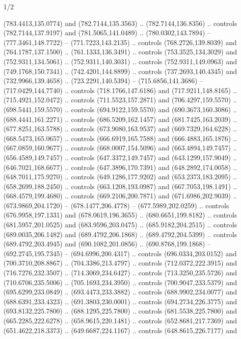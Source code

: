 \begin{flagdescription}{1/2}
\begin{scope}[shift={(2*\flaglength/3-0.25*\rb,0.51333\flagwidth)},scale=0.001715\flagwidth*\stretchfactor]
\begin{scope}[y=-1pt, x=1pt,cm={{1.04354,0.0,0.0,1.01818,(-827,-297)}}]
\begin{scope}[fill=gold]
  (783.4413,135.0774) and (782.7144,135.3563) .. (782.7144,136.8356) .. controls
  (782.7144,137.9197) and (781.5065,141.0489) .. (780.0302,143.7894) --
  (777.3461,148.7722) -- (771.7223,143.2135) .. controls (768.2726,139.8039) and
  (764.1787,137.1500) .. (761.1333,136.3491) .. controls (753.3525,134.3029) and
  (752.9311,134.5061) .. (752.9311,140.3031) .. controls (752.9311,149.0963) and
  (749.1768,150.7341) .. (742.4201,144.8899) .. controls (737.2693,140.4345) and
  (732.9966,139.4658) .. (723.2291,140.5394) -- (715.6856,141.3686) --
  (717.0429,144.7740) .. controls (718.1766,147.6186) and (717.9211,148.8165) ..
  (715.4921,152.0472) .. controls (711.5523,157.2871) and (706.4297,159.5570) ..
  (698.5441,159.5570) .. controls (694.9122,159.5570) and (690.3673,160.3086) ..
  (688.4441,161.2271) .. controls (686.5209,162.1457) and (681.7425,163.2039) ..
  (677.8251,163.5788) .. controls (673.9080,163.9537) and (669.7329,164.6228) ..
  (668.5473,165.0657) .. controls (666.6919,165.7588) and (666.4883,165.1876) ..
  (667.0859,160.9677) .. controls (668.0007,154.5096) and (663.4894,149.7457) ..
  (656.4589,149.7457) .. controls (647.3372,149.7457) and (643.1299,157.9049) ..
  (646.7021,168.6677) .. controls (647.3896,170.7391) and (648.2892,174.0058) ..
  (648.7011,175.9270) .. controls (649.1286,177.9202) and (653.2373,183.2095) ..
  (658.2699,188.2450) .. controls (663.1208,193.0987) and (667.7053,198.1491) ..
  (668.4579,199.4680) .. controls (669.2106,200.7871) and (671.6986,202.9039) ..
  (673.9869,204.1720) -- (678.1477,206.4778) -- (677.5989,202.0259) .. controls
  (676.9958,197.1331) and (678.0619,196.3655) .. (680.6651,199.8182) .. controls
  (681.5957,201.0525) and (683.9596,203.0475) .. (685.9182,204.2515) .. controls
  (689.0035,206.1482) and (689.4792,206.1868) .. (689.4792,204.5399) .. controls
  (689.4792,203.4945) and (690.1082,201.0856) .. (690.8768,199.1868) --
  (692.2745,195.7345) -- (694.6996,200.4317) .. controls (696.0334,203.0152) and
  (700.3710,208.8867) .. (704.3386,213.4797) .. controls (712.0372,222.3915) and
  (716.7276,232.3507) .. (714.3069,234.6427) .. controls (713.3250,235.5726) and
  (710.6706,235.5006) .. (705.1693,234.3950) .. controls (700.9047,233.5379) and
  (695.6299,233.0849) .. (693.4473,233.3882) .. controls (688.9902,234.0077) and
  (688.6391,233.4323) .. (691.3803,230.0001) .. controls (694.2734,226.3775) and
  (693.8132,225.7800) .. (688.1295,225.7800) .. controls (681.5538,225.7800) and
  (665.2285,222.6278) .. (658.9615,220.1481) .. controls (652.8681,217.7369) and
  (651.4622,218.3373) .. (649.6687,224.1167) .. controls (648.8615,226.7177) and

\end{scope}
\end{scope}
\end{scope}
\end{flagdescription}
